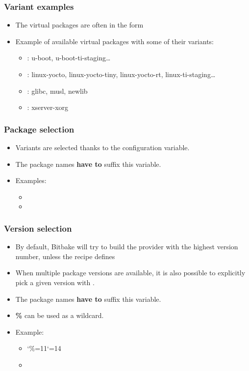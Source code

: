 \begin{frame}
  \frametitle{Variant examples}
  \begin{itemize}
    \item The virtual packages are often in the form
    \item Example of available virtual packages with some of their
      variants:
      \begin{itemize}
        \item {}: u-boot,
          u-boot-ti-staging\dots
        \item {}: linux-yocto, linux-yocto-tiny,
          linux-yocto-rt, linux-ti-staging\dots
        \item {}: glibc, musl, newlib
        \item {}: xserver-xorg
      \end{itemize}
  \end{itemize}
\end{frame}

\begin{frame}
  \frametitle{Package selection}
  \begin{itemize}
    \item Variants are selected thanks to the
       configuration variable.
    \item The package names {\bf have to} suffix this variable.
    \item Examples:
    \begin{itemize}
      \item {}
      \item {}
    \end{itemize}
  \end{itemize}
\end{frame}

\begin{frame}
  \frametitle{Version selection}
  \begin{itemize}
    \item By default, Bitbake will try to build the provider with the
      highest version number, unless the recipe defines
    \item When multiple package versions are available, it is also
      possible to explicitly pick a given version with
      .
    \item The package names {\bf have to} suffix this variable.
    \item {\bf \%} can be used as a wildcard.
    \item Example:
    \begin{itemize}
      \item \catcode`\%=11\catcode`\@=14
      \item {}
    \end{itemize}
  \end{itemize}
\end{frame}

